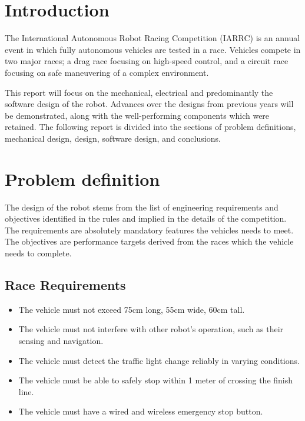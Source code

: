 \documentclass[11pt,journal]{IEEEtran}
\begin{document}
%
\IEEEpeerreviewmaketitle

\section{Introduction}
The International Autonomous Robot Racing Competition (IARRC) is an annual event in which fully autonomous vehicles are tested in a race. Vehicles compete in two major races; a drag race focusing on high-speed control, and a circuit race focusing on safe maneuvering of a complex environment. 

This report will focus on the mechanical, electrical and predominantly the software design of the robot. Advances over the designs from previous years will be demonstrated, along with the well-performing components which were retained. The following report is divided into the sections of problem definitions, mechanical design, design, software design, and conclusions.

\section{Problem definition}
The design of the robot stems from the list of engineering requirements and objectives identified in the rules and implied in the details of the competition. The requirements are absolutely mandatory features the vehicles needs to meet. The objectives are performance targets derived from the races which the vehicle needs to complete.

\subsection{Race Requirements}

\begin{itemize}
  \item The vehicle must not exceed 75cm long, 55cm wide, 60cm tall.
  \item The vehicle must not interfere with other robot's operation, such as their sensing and navigation.
  \item The vehicle must detect the traffic light change reliably in varying conditions.
  \item The vehicle must be able to safely stop within 1 meter of crossing the finish line.
  \item The vehicle must have a wired and wireless emergency stop button.
\end{itemize}
\end{document}
